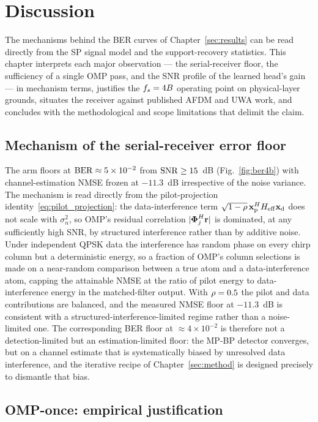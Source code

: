 \section{Discussion}
\label{sec:discussion}

The mechanisms behind the BER curves of Chapter~\ref{sec:results} can be read directly from the SP signal model and the support-recovery statistics. This chapter interprets each major observation --- the serial-receiver floor, the sufficiency of a single OMP pass, and the SNR profile of the learned head's gain --- in mechanism terms, justifies the $f_s = 4B$ operating point on physical-layer grounds, situates the receiver against published AFDM and UWA work, and concludes with the methodological and scope limitations that delimit the claim.

\subsection{Mechanism of the serial-receiver error floor}
\label{ssec:disc_serial}

The \Serial{} arm floors at $\mathrm{BER} \approx 5 \times 10^{-2}$ from $\mathrm{SNR} \geq 15$~dB (Fig.~\ref{fig:ber4b}) with channel-estimation NMSE frozen at $-11.3$~dB irrespective of the noise variance. The mechanism is read directly from the pilot-projection identity~\eqref{eq:pilot_projection}: the data-interference term $\sqrt{1-\rho}\,\mathbf{x}_{\mathrm{p}}^H H_{\mathrm{eff}} \mathbf{x}_{\mathrm{d}}$ does not scale with $\sigma_n^2$, so OMP's residual correlation $|\boldsymbol{\Phi}_j^H \mathbf{r}|$ is dominated, at any sufficiently high SNR, by structured interference rather than by additive noise. Under independent QPSK data the interference has random phase on every chirp column but a deterministic energy, so a fraction of OMP's column selections is made on a near-random comparison between a true atom and a data-interference atom, capping the attainable NMSE at the ratio of pilot energy to data-interference energy in the matched-filter output. With $\rho = 0.5$ the pilot and data contributions are balanced, and the measured NMSE floor at $-11.3$~dB is consistent with a structured-interference-limited regime rather than a noise-limited one. The corresponding BER floor at $\approx 4 \times 10^{-2}$ is therefore not a detection-limited but an estimation-limited floor: the MP-BP detector converges, but on a channel estimate that is systematically biased by unresolved data interference, and the iterative recipe of Chapter~\ref{sec:method} is designed precisely to dismantle that bias.

\subsection{OMP-once: empirical justification}
\label{ssec:disc_complexity}

